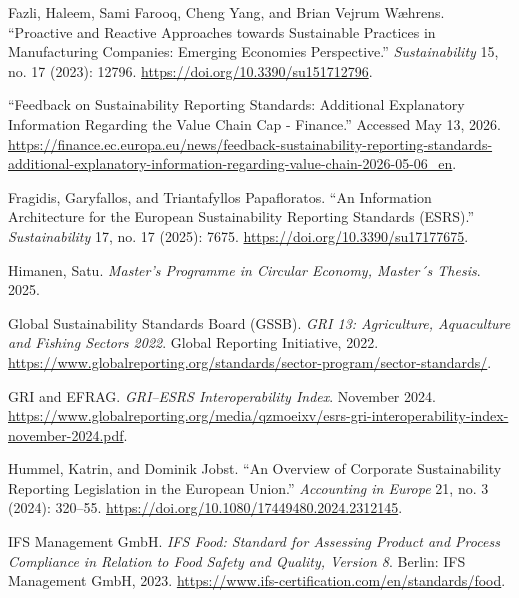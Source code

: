 Fazli, Haleem, Sami Farooq, Cheng Yang, and Brian Vejrum Wæhrens. ``Proactive and Reactive Approaches towards Sustainable Practices in Manufacturing Companies: Emerging Economies Perspective.'' \emph{Sustainability} 15, no. 17 (2023): 12796. \url{https://doi.org/10.3390/su151712796}.

``Feedback on Sustainability Reporting Standards: Additional Explanatory Information Regarding the Value Chain Cap - Finance.'' Accessed May 13, 2026. \url{https://finance.ec.europa.eu/news/feedback-sustainability-reporting-standards-additional-explanatory-information-regarding-value-chain-2026-05-06\_en}.

Fragidis, Garyfallos, and Triantafyllos Papafloratos. ``An Information Architecture for the European Sustainability Reporting Standards (ESRS).'' \emph{Sustainability} 17, no. 17 (2025): 7675. \url{https://doi.org/10.3390/su17177675}.

Himanen, Satu. \emph{Master's Programme in Circular Economy, Master´s Thesis}. 2025.

Global Sustainability Standards Board (GSSB). \emph{GRI 13: Agriculture, Aquaculture and Fishing Sectors 2022}. Global Reporting Initiative, 2022. \url{https://www.globalreporting.org/standards/sector-program/sector-standards/}. %

GRI and EFRAG. \emph{GRI--ESRS Interoperability Index}. November 2024. \url{https://www.globalreporting.org/media/qzmoeixv/esrs-gri-interoperability-index-november-2024.pdf}. %

Hummel, Katrin, and Dominik Jobst. ``An Overview of Corporate Sustainability Reporting Legislation in the European Union.'' \emph{Accounting in Europe} 21, no. 3 (2024): 320--55. \url{https://doi.org/10.1080/17449480.2024.2312145}.

IFS Management GmbH. \emph{IFS Food: Standard for Assessing Product and Process Compliance in Relation to Food Safety and Quality, Version 8}. Berlin: IFS Management GmbH, 2023. \url{https://www.ifs-certification.com/en/standards/food}. %

